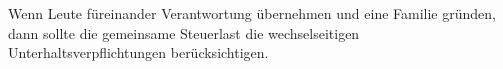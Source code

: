 Wenn Leute füreinander Verantwortung übernehmen und eine Familie gründen, dann sollte die gemeinsame Steuerlast die wechselseitigen Unterhaltsverpflichtungen berücksichtigen.